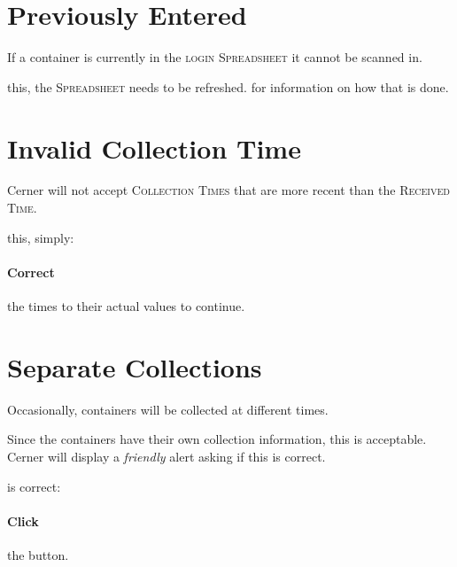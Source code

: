 \section{Previously Entered}

If a container is currently in the \textsc{\gls{login} Spreadsheet} it cannot be scanned in.\\


 this, the \textsc{Spreadsheet} needs to be refreshed.  for information on how that is done.


\section{Invalid Collection Time}

Cerner will not accept \textsc{Collection Times} that are more recent than the \textsc{Received Time}.\\


 this, simply:

\paragraph{Correct} the times to their actual values to continue.


\section{Separate Collections}\label{sec:sep_collection}
Occasionally, containers will be collected at different times.

Since the containers have their own collection information, this is acceptable. Cerner will display a \textit{friendly} alert asking if this is correct.\\


 is correct:

\paragraph{Click} the  button.

